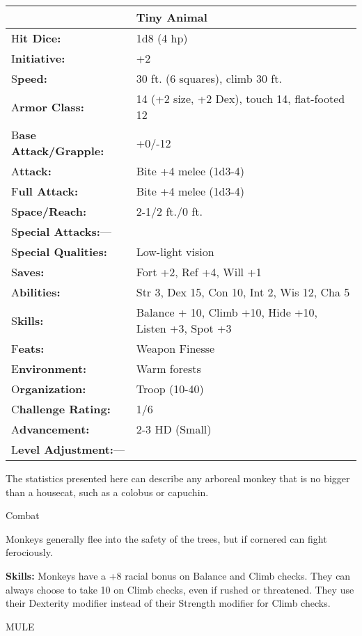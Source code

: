 \documentclass{article}
\begin{document}
\begin{tabular}{|>{\raggedright}p{91pt}|>{\raggedright}p{222pt}|}
\hline
  & Tiny Animal\tabularnewline
\hline
H\textbf{it Dice:} & 1d8 (4 hp)\tabularnewline
\hline
I\textbf{nitiative:} & +2\tabularnewline
\hline
S\textbf{peed:} & 30 ft. (6 squares), climb 30 ft.\tabularnewline
\hline
A\textbf{rmor Class:} & 14 (+2 size, +2 Dex), touch 14, flat-footed 12\tabularnewline
\hline
B\textbf{ase Attack/Grapple:} & +0/-12\tabularnewline
\hline
A\textbf{ttack:} & Bite +4 melee (1d3-4)\tabularnewline
\hline
F\textbf{ull Attack:} & Bite +4 melee (1d3-4)\tabularnewline
\hline
S\textbf{pace/Reach:} & 2-1/2 ft./0 ft.\tabularnewline
\hline
S\textbf{pecial Attacks:}--- & \tabularnewline
\hline
S\textbf{pecial Qualities:} & Low-light vision\tabularnewline
\hline
S\textbf{aves:} & Fort +2, Ref +4, Will +1\tabularnewline
\hline
A\textbf{bilities:} & Str 3, Dex 15, Con 10, Int 2, Wis 12, Cha 5\tabularnewline
\hline
S\textbf{kills:} & Balance + 10, Climb +10, Hide +10, Listen +3, Spot +3\tabularnewline
\hline
F\textbf{eats:} & Weapon Finesse\tabularnewline
\hline
E\textbf{nvironment:} & Warm forests\tabularnewline
\hline
O\textbf{rganization:} & Troop (10-40)\tabularnewline
\hline
C\textbf{hallenge Rating:} & 1/6\tabularnewline
\hline
A\textbf{dvancement:} & 2-3 HD (Small)\tabularnewline
\hline
L\textbf{evel Adjustment:}--- & \tabularnewline
\hline
\end{tabular}

The statistics presented here can describe any arboreal monkey that is no bigger 
than a housecat, such as a colobus or capuchin.

Combat

Monkeys generally flee into the safety of the trees, but if cornered can fight 
ferociously.

\textbf{Skills:} Monkeys have a +8 racial bonus on Balance and Climb checks. They 
can always choose to take 10 on Climb checks, even if rushed or threatened. They 
use their Dexterity modifier instead of their Strength modifier for Climb checks.

\vspace{12pt}
MULE
\end{document}
